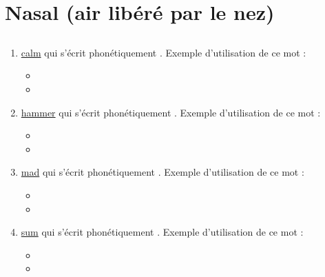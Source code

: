\section{Nasal (air libéré par le nez)}\label{sec:nasal}

\subsection{}\label{sec:m}

\begin{enumerate}
\item \href{http://www.wordreference.com/enfr/calm}{calm} qui s'écrit phonétiquement \href{https://en.oxforddictionaries.com/definition/calm}{}. Exemple d'utilisation de ce
mot :

\begin{itemize}
\item{}
\item{}
\end{itemize}

\item \href{http://www.wordreference.com/enfr/hammer}{hammer} qui s'écrit phonétiquement \href{https://en.oxforddictionaries.com/definition/hammer}{}. Exemple d'utilisation de
ce mot :

\begin{itemize}
\item{}
\item{}
\end{itemize}

\item \href{http://www.wordreference.com/enfr/mad}{mad} qui s'écrit phonétiquement \href{https://en.oxforddictionaries.com/definition/mad}{}. Exemple d'utilisation de ce
mot :

\begin{itemize}
\item{}
\item{}
\end{itemize}

\item \href{http://www.wordreference.com/enfr/sum}{sum} qui s'écrit phonétiquement \href{https://en.oxforddictionaries.com/definition/sum}{}. Exemple d'utilisation de ce
  mot :
  
\begin{itemize}
\item{}
\item{}
\end{itemize}

\end{enumerate}

